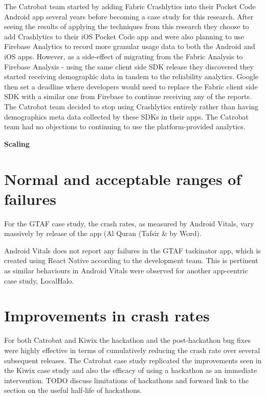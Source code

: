 The Catrobat team started by adding Fabric Crashlytics into their Pocket Code Android app several years before becoming a case study for this research. After seeing the results of applying the techniques from this research they choose to add Crashlytics to their iOS Pocket Code app and were also planning to use Firebase Analytics to record more granular usage data to both the Android and iOS apps. However, as a side-effect of migrating from the Fabric Analysis to Firebase Analysis - using the same client side SDK release they discovered they started receiving demographic data in tandem to the reliability analytics. Google then set a deadline where developers would need to replace the Fabric client side SDK with a similar one from Firebase to continue receiving any of the reports. The Catrobat team decided to stop using Crashlytics entirely rather than having demographics meta data collected by these SDKs in their apps. The Catrobat team had no objections to continuing to use the platform-provided analytics.

\textbf{Scaling}


\section{Normal and acceptable ranges of failures}
For the GTAF case study, the crash rates, as measured by Android Vitals, vary massively by release of the app (Al Quran (Tafsir \& by Word). 

Android Vitals does not report any failures in the GTAF taskinator app, which is created using React Native according to the development team. This is pertinent as similar behaviours in Android Vitals were observed for another app-centric case study, LocalHalo. 


\section{Improvements in crash rates}
For both Catrobat and Kiwix the hackathon and the post-hackathon bug fixes were highly effective in terms of cumulatively reducing the crash rate over several subsequent releases. %
The Catrobat case study replicated the improvements seen in the Kiwix case study and also the efficacy of using a hackathon as an immediate intervention. TODO discuss limitations of hackathons and forward link to the section on the useful half-life of hackathons. 


